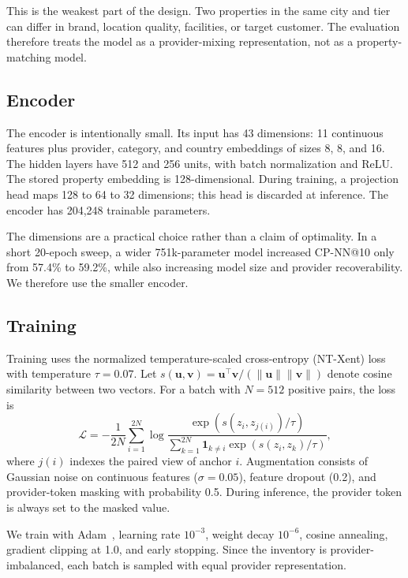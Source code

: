 \documentclass[conference,a4paper]{IEEEtran}
\begin{document}
This is the weakest part of the design. Two properties in the same city and tier can differ in brand, location quality, facilities, or target customer. The evaluation therefore treats the model as a provider-mixing representation, not as a property-matching model.

\subsection{Encoder}

The encoder is intentionally small. Its input has 43 dimensions: 11 continuous features plus provider, category, and country embeddings of sizes 8, 8, and 16. The hidden layers have 512 and 256 units, with batch normalization and ReLU. The stored property embedding is 128-dimensional. During training, a projection head maps 128 to 64 to 32 dimensions; this head is discarded at inference. The encoder has 204,248 trainable parameters.

The dimensions are a practical choice rather than a claim of optimality. In a short 20-epoch sweep, a wider 751k-parameter model increased CP-NN@10 only from 57.4\% to 59.2\%, while also increasing model size and provider recoverability. We therefore use the smaller encoder.

\subsection{Training}

Training uses the normalized temperature-scaled cross-entropy (NT-Xent) loss~\cite{chen2020simclr} with temperature $\tau=0.07$. Let $s(\mathbf{u},\mathbf{v})=\mathbf{u}^\top\mathbf{v}/(\|\mathbf{u}\|\|\mathbf{v}\|)$ denote cosine similarity between two vectors. For a batch with $N=512$ positive pairs, the loss is
\begin{equation}
\mathcal{L}=
-\frac{1}{2N}\sum_{i=1}^{2N}
\log\frac{\exp(s(z_i,z_{j(i)})/\tau)}
{\sum_{k=1}^{2N}\mathbf{1}_{k\neq i}\exp(s(z_i,z_k)/\tau)},
\label{eq:loss}
\end{equation}
where $j(i)$ indexes the paired view of anchor $i$. Augmentation consists of Gaussian noise on continuous features ($\sigma=0.05$), feature dropout (0.2), and provider-token masking with probability 0.5. During inference, the provider token is always set to the masked value.

We train with Adam~\cite{kingma2015adam}, learning rate $10^{-3}$, weight decay $10^{-6}$, cosine annealing, gradient clipping at 1.0, and early stopping. Since the inventory is provider-imbalanced, each batch is sampled with equal provider representation.
\end{document}
